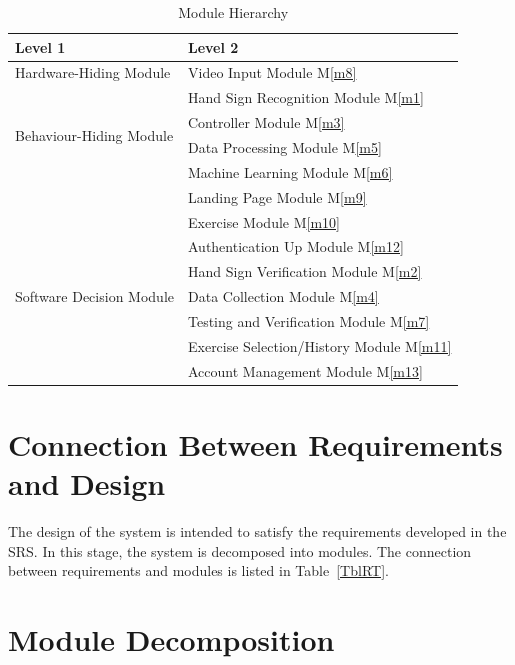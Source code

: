 \documentclass[12pt, titlepage]{article}
\newcommand{\mref}[1]{M\ref{#1}}
\begin{document}
\begin{table}[h!]
\centering
\begin{tabular}{p{} p{}}
\toprule
\textbf{Level 1} & \textbf{Level 2}\\
\midrule

\multirow{1}{0.3\textwidth}{Hardware-Hiding Module} 
& Video Input Module \mref{m8}\\
\midrule

\multirow{4}{0.3\textwidth}{Behaviour-Hiding Module} 
& Hand Sign Recognition Module \mref{m1}\\
& Controller Module \mref{m3}\\
& Data Processing Module \mref{m5}\\
& Machine Learning Module \mref{m6}\\
& Landing Page Module \mref{m9}\\
& Exercise Module \mref{m10}\\
& Authentication Up Module \mref{m12}\\
\midrule

\multirow{3}{0.3\textwidth}{Software Decision Module} 
& Hand Sign Verification Module \mref{m2}\\
& Data Collection Module \mref{m4}\\
& Testing and Verification Module \mref{m7}\\
& Exercise Selection/History Module \mref{m11}\\
& Account Management Module \mref{m13}\\
\bottomrule

\end{tabular}
\caption{Module Hierarchy}
\label{TblMH}
\end{table}

\section{Connection Between Requirements and Design} \label{SecConnection}

The design of the system is intended to satisfy the requirements developed in
the SRS. In this stage, the system is decomposed into modules. The connection
between requirements and modules is listed in Table~\ref{TblRT}.

\section{Module Decomposition} \label{SecMD}
\end{document}
